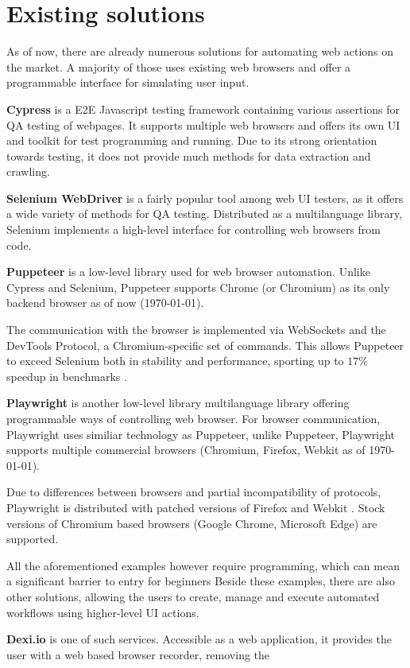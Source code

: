 
\section{Existing solutions}
As of now, there are already numerous solutions for automating web actions on the market. 
A majority of those uses existing web browsers and offer a programmable interface for simulating user input.

\textbf{Cypress} is a \ac{E2E} Javascript testing framework containing various assertions for \ac{QA} testing of webpages.
It supports multiple web browsers and offers its own UI and toolkit for test programming and running. 
Due to its strong orientation towards testing, it does not provide much methods for data extraction and crawling.

\textbf{Selenium WebDriver} is a fairly popular tool among web UI testers, as it offers a wide variety of methods for \ac{QA} testing.
Distributed as a multilanguage library, Selenium implements a high-level interface for controlling web browsers from code.

\textbf{Puppeteer} is a low-level library used for web browser automation. 
Unlike Cypress and Selenium, Puppeteer supports Chrome (or Chromium) as its only backend browser as of now (\today).

The communication with the browser is implemented via WebSockets and the DevTools Protocol, a Chromium-specific set of commands.
This allows Puppeteer to exceed Selenium both in stability and performance, sporting up to $17\%$ speedup in benchmarks .

\textbf{Playwright} is another low-level library multilanguage library offering programmable ways of controlling web browser.
For browser communication, Playwright uses similiar technology as Puppeteer, unlike Puppeteer, Playwright supports multiple commercial browsers (Chromium, Firefox, Webkit as of \today).

Due to differences between browsers and partial incompatibility of protocols, Playwright is distributed with patched versions of Firefox and Webkit .
Stock versions of Chromium based browsers (Google Chrome, Microsoft Edge) are supported. 

\emptyline

All the aforementioned examples however require programming, which can mean a significant barrier to entry for beginners
Beside these examples, there are also other solutions, allowing the users to create, manage and execute automated workflows using higher-level UI actions.

\emptyline

\textbf{Dexi.io} is one of such services. Accessible as a web application, it provides the user with a web based browser recorder, removing the 
